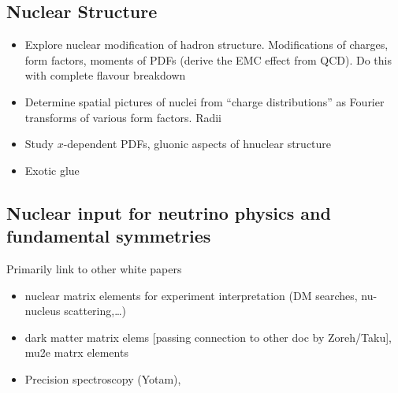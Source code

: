 \subsection{Nuclear Structure}

\begin{itemize}
	\item Explore nuclear modification of hadron structure. Modifications of charges, form factors, moments of PDFs  (derive the EMC effect from QCD). 
	Do this with complete flavour breakdown
	\item Determine spatial pictures of nuclei from ``charge distributions'' as Fourier transforms of various form factors. Radii
	\item Study $x$-dependent PDFs, gluonic aspects of hnuclear structure
	\item Exotic glue
\end{itemize}



\subsection{Nuclear input for neutrino physics and fundamental symmetries}

Primarily link to other white papers
\begin{itemize}
	\item nuclear matrix elements for experiment interpretation (DM searches, nu-nucleus scattering,…)
	\item dark matter matrix elems [passing connection to other doc by Zoreh/Taku], mu2e matrx elements
	\item Precision spectroscopy (Yotam), 
\end{itemize}




